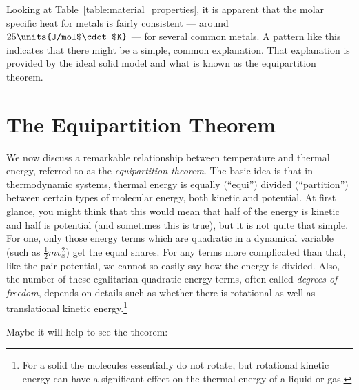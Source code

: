 Looking at Table~\ref{table:material_properties}, it is apparent that
the molar specific heat for metals is fairly consistent --- around 
$25\units{J/mol$\cdot$K}$ --- for several common metals.  A pattern like this
indicates that there might be a simple, common explanation.  That
explanation is provided by the ideal solid model and what is known as the
equipartition theorem.

\section{The Equipartition Theorem}
\label{sec:equipartition}

We now discuss a remarkable relationship between temperature and
thermal energy, referred to as the {\em equipartition theorem}.  The
basic idea is that in thermodynamic systems, thermal energy is equally
(``equi'') divided (``partition'') between certain types of molecular
energy, both kinetic and potential.  At first glance, you might think
that this would mean that half of the energy is kinetic and half is
potential (and sometimes this is true), but it is not quite that simple.
For one, only those energy terms which are quadratic in a
dynamical variable (such as $\frac{1}{2}mv_x^2$) get the equal shares.
For any terms more complicated than that, like the pair potential, we
cannot so easily say how the energy is divided.  Also, the number of these
egalitarian quadratic energy terms, often called {\it degrees of freedom},
depends on details such as whether there is rotational as well as
translational kinetic energy.\footnote{For a solid the molecules
  essentially do not rotate, but rotational kinetic energy can have a
  significant effect on the thermal energy of a liquid or gas.}



Maybe it will help to see the theorem:

